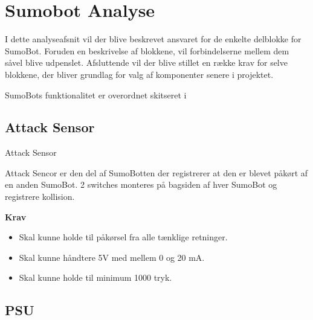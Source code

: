 \section{Sumobot Analyse}\label{sec:Sumobot:analyse}

I dette analyseafsnit vil der blive beskrevet ansvaret for de enkelte delblokke for SumoBot. Foruden en beskrivelse af blokkene, vil forbindelserne mellem dem såvel blive udpenslet. Afsluttende vil der blive stillet en række krav for selve blokkene, der bliver grundlag for valg af komponenter senere i projektet.

SumoBots funktionalitet er overordnet skitseret i 


\subsection{Attack Sensor}

\begin{PartBlokDescription}{Attack Sensor}{}

\BlokSpacer{0cm}
\end{PartBlokDescription}

Attack Sencor er den del af SumoBotten der registrerer at den er blevet påkørt af en anden SumoBot.
2 switches monteres på bagsiden af hver SumoBot og registrere kollision.

\textbf{Krav}
\begin{itemize}
\item Skal kunne holde til påkørsel fra alle tænklige retninger.
\item Skal kunne håndtere 5V med mellem 0 og 20 mA.
\item Skal kunne holde til minimum 1000 tryk.
\end{itemize}


\subsection{PSU}

